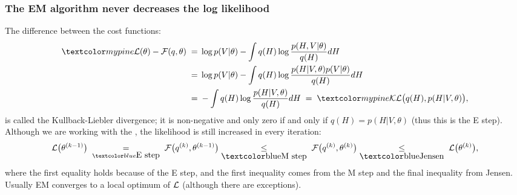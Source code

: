 \begin{frame}
\frametitle{The EM algorithm never decreases the log likelihood}

The difference between the cost functions:
%
\begin{equation*}
\begin{split}
\Green{{\cal L}(\theta)-{\cal F}(q,\theta)}\;=&\;\log p(V|\theta)
-\int q(H)\log\frac{p(H,V|\theta)}{q(H)}dH\\
=&\;\log p(V|\theta)-\int q(H)\log\frac{p(H|V,\theta)p(V|\theta)}{q(H)}dH\\
=&\;-\int q(H)\log\frac{p(H|V,\theta)}{q(H)}dH\;=\;
\Green{{\cal KL}\big(q(H),p(H|V,\theta)\big)},
\end{split}
\end{equation*}
%
is called the Kullback-Liebler divergence; it is non-negative and only
zero if and only if $q(H)=p(H|V,\theta)$ (thus this is the E
step). Although we are working with the , the
likelihood is still increased in every iteration:
%
\begin{equation*}
{\cal L}\big(\theta^{(k-1)}\big)\;
\underset{\Blue{\mbox{E step}}}{=}
\;{\cal F}\big(q^{(k)},\theta^{(k-1)}\big)
\underset{\mbox{\Blue{M step}}}{\leq}
\;{\cal F}\big(q^{(k)},\theta^{(k)}\big)
\underset{\mbox{\Blue{Jensen}}}{\leq}
\;{\cal L}\big(\theta^{(k)}\big),
\end{equation*}
where the first equality holds because of the E step, and the first inequality
comes from the M step and the final inequality from Jensen. Usually EM
converges to a local optimum of ${\cal L}$ (although there are exceptions).
\end{frame}


